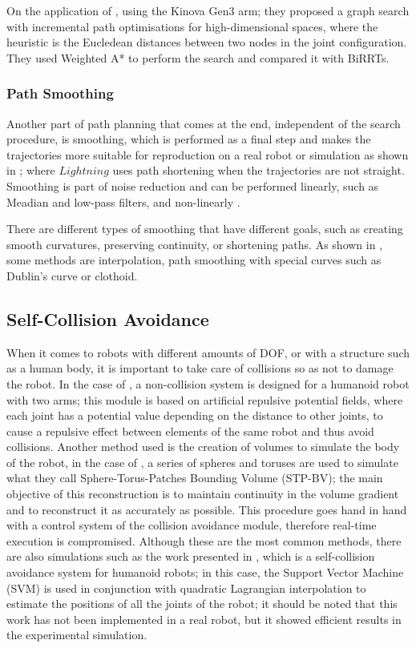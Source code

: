 \documentclass[thesis]{mas_proposal}
\begin{document}
    On the application of \cite{Natarajan2023}, using the Kinova Gen3 arm; they proposed a graph search with incremental path optimisations for high-dimensional spaces, where the heuristic is the Eucledean distances between two nodes in the joint configuration. They used Weighted A* to perform the search and compared it with BiRRTs.
    
    \subsubsection{Path Smoothing}
    
    Another part of path planning that comes at the end, independent of the search procedure, is smoothing, which is performed as a final step and makes the trajectories more suitable for reproduction on a real robot or simulation as shown in \cite{Berenson2012, Coleman2015}; where $Lightning$ uses path shortening when the trajectories are not straight. Smoothing is part of noise reduction and can be performed linearly, such as Meadian and low-pass filters, and non-linearly \cite{Siegwart2011, Ravichandar2020, Si2021}.
    
    There are different types of smoothing that have different goals, such as creating smooth curvatures, preserving continuity, or shortening paths. As shown in \cite{Ravankar2018}, some methods are interpolation, path smoothing with special curves such as Dublin's curve or clothoid.
    
    \subsection{Self-Collision Avoidance}
    
    When it comes to robots with different amounts of DOF, or with a structure such as a human body, it is important to take care of collisions so as not to damage the robot. In the case of \cite{Dietrich2012, Santis2007}, a non-collision system is designed for a humanoid robot with two arms; this module is based on artificial repulsive potential fields, where each joint has a potential value depending on the distance to other joints, to cause a repulsive effect between elements of the same robot and thus avoid collisions. Another method used is the creation of volumes to simulate the body of the robot, in the case of \cite{Stasse2008}, a series of spheres and toruses are used to simulate what they call Sphere-Torus-Patches Bounding Volume (STP-BV); the main objective of this reconstruction is to maintain continuity in the volume gradient and to reconstruct it as accurately as possible. This procedure goes hand in hand with a control system of the collision avoidance module, therefore real-time execution is compromised. Although these are the most common methods, there are also simulations such as the work presented in \cite{Fang2015}, which is a self-collision avoidance system for humanoid robots; in this case, the Support Vector Machine (SVM) is used in conjunction with quadratic Lagrangian interpolation to estimate the positions of all the joints of the robot; it should be noted that this work has not been implemented in a real robot, but it showed efficient results in the experimental simulation.
    
\end{document}
